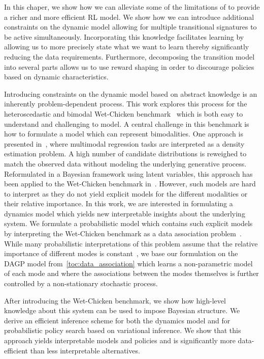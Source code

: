In this chaper, we show how we can alleviate some of the limitations of \parencite{deisenroth_pilco_2011} to provide a richer and more efficient RL model.
We show how we can introduce additional constraints on the dynamic model allowing for multiple transitional signatures to be active simultaneously.
Incorporating this knowledge facilitates learning by allowing us to more precisely state what we want to learn thereby significantly reducing the data requirements.
Furthermore, decomposing the transition model into several parts allows us to use reward shaping \parencite{sutton_reinforcement_2018} in order to discourage policies based on dynamic characteristics.

Introducing constraints on the dynamic model based on abstract knowledge is an inherently problem-dependent process.
This work explores this process for the heteroscedastic and bimodal Wet-Chicken benchmark~\parencite{tresp_wet_1994,hans_efficient_2009} which is both easy to understand and challenging to model.
A central challenge in this benchmark is how to formulate a model which can represent bimodalities.
One approach is presented in~\parencite{bishop_mixture_1994}, where multimodal regression tasks are interpreted as a density estimation problem.
A high number of candidate distributions is reweighed to match the observed data without modeling the underlying generative process.
Reformulated in a Bayesian framework using latent variables, this approach has been applied to the Wet-Chicken benchmark in~\parencite{depeweg_learning_2016,depeweg_decomposition_2018}.
However, such models are hard to interpret as they do not yield explicit models for the different modalities or their relative importance.
In this work, we are interested in formulating a dynamics model which yields new interpretable insights about the underlying system.
We formulate a probabilistic model which contains such explicit models by interpreting the Wet-Chicken benchmark as a data association problem~\parencite{barshalom_tracking_1990,cox_review_1993}.
While many probabilistic interpretations of this problem assume that the relative importance of different modes is constant~\parencite{lazaro-gredilla_overlapping_2012,bodin_latent_2017}, we base our formulation on the DAGP model from~\cref{toc:data_association} which learns a non-parametric model of each mode and where the associations between the modes themselves is further controlled by a non-stationary stochastic process.

After introducing the Wet-Chicken benchmark, we show how high-level knowledge about this system can be used to impose Bayesian structure.
We derive an efficient inference scheme for both the dynamics model and for probabilistic policy search based on variational inference.
We show that this approach yields interpretable models and policies and is significantly more data-efficient than less interpretable alternatives.


